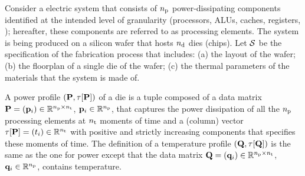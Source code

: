 
Consider a electric system that consists of ${n_\text{p}}$ power-dissipating components identified at the intended level of granularity (processors, ALUs, caches, registers, \etc); hereafter, these components are referred to as processing elements.
The system is being produced on a silicon wafer that hosts ${n_\text{d}}$ dies (chips).
Let $\mathcal{S}$ be the specification of the fabrication process that includes: (a) the layout of the wafer; (b) the floorplan of a single die of the wafer; (c) the thermal parameters of the materials that the system is made of.

A power profile $\profileP$ of a die is a tuple composed of a data matrix $\mathbf{P} = (\mathbf{p}_i) \in \mathbb{R}^{{n_\text{p}} \times {n_\text{t}}}$, $\mathbf{p}_i \in \mathbb{R}^{n_\text{p}}$, that captures the power dissipation of all the ${n_\text{p}}$ processing elements at ${n_\text{t}}$ moments of time and a (column) vector $\tau[\mathbf{P}] = (t_i) \in \mathbb{R}^{{n_\text{t}}}$ with positive and strictly increasing components that specifies these moments of time.
The definition of a temperature profile $\profileT$ is the same as the one for power except that the data matrix $\mathbf{Q} = (\mathbf{q}_i) \in \mathbb{R}^{{n_\text{p}} \times {n_\text{t}}}$, $\mathbf{q}_i \in \mathbb{R}^{n_\text{p}}$, contains temperature.

